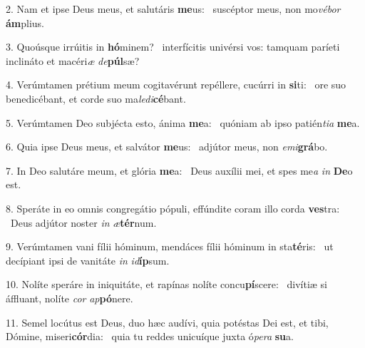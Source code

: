 2. Nam et ipse Deus meus, et salutáris \textbf{me}us: \ast\  suscéptor meus, non mo\textit{vé}\textit{bor} \textbf{ám}plius.\

3. Quoúsque irrúitis in \textbf{hó}minem? \ast\  interfícitis univérsi vos: tamquam paríeti inclináto et macéri\textit{æ} \textit{de}\textbf{púl}sæ?\

4. Verúmtamen prétium meum cogitavérunt repéllere, cucúrri in \textbf{si}ti: \ast\  ore suo benedicébant, et corde suo ma\textit{le}\textit{di}\textbf{cé}bant.\

5. Verúmtamen Deo subjécta esto, ánima \textbf{me}a: \ast\  quóniam ab ipso patién\textit{ti}\textit{a} \textbf{me}a.\

6. Quia ipse Deus meus, et salvátor \textbf{me}us: \ast\  adjútor meus, non \textit{e}\textit{mi}\textbf{grá}bo.\

7. In Deo salutáre meum, et glória \textbf{me}a: \ast\  Deus auxílii mei, et spes me\textit{a} \textit{in} \textbf{De}o est.\

8. Speráte in eo omnis congregátio pópuli, effúndite coram illo corda \textbf{ves}tra: \ast\  Deus adjútor noster \textit{in} \textit{æ}\textbf{tér}num.\

9. Verúmtamen vani fílii hóminum, mendáces fílii hóminum in sta\textbf{té}ris: \ast\  ut decípiant ipsi de vanitáte \textit{in} \textit{id}\textbf{íp}sum.\

10. Nolíte speráre in iniquitáte, et rapínas nolíte concu\textbf{pí}scere: \ast\  divítiæ si áffluant, nolíte \textit{cor} \textit{ap}\textbf{pó}nere.\

11. Semel locútus est Deus, duo hæc audívi, quia potéstas Dei est, et tibi, Dómine, miseri\textbf{cór}dia: \ast\  quia tu reddes unicuíque juxta ó\textit{pe}\textit{ra} \textbf{su}a.\

